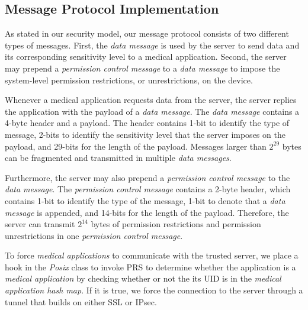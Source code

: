 \subsection{Message Protocol Implementation} 

As stated in our
security model, our message protocol consists of two different
types of messages.  First, the \textit{data message} is
used by the server to send data and its corresponding
sensitivity level to a medical application.  Second, the
server may prepend a \textit{permission control message} to a
\textit{data message} to impose the system-level permission
restrictions, or unrestrictions, on the device.

Whenever a medical application requests data from the server,
the server replies the application with the payload of a \textit{data
message}.  The \textit{data message} 
contains a 4-byte header and a payload.  The header contains 1-bit to
identify the type of message, 2-bits to identify the sensitivity level
that the server imposes on the payload, and  29-bits for the length of
the payload. Messages larger than $2^{29}$ bytes can be fragmented and
transmitted in multiple \textit{data messages}.

Furthermore, the server may also prepend a \textit{permission
 control message} to the \textit{data message}.  The
\textit{permission control message} contains a 2-byte header, which
 contains 1-bit to identify the type of the message, 1-bit to denote
that a \textit{data message} is appended, and 14-bits for
the length of the payload.  Therefore, the server can
transmit $2^{14}$ bytes of permission restrictions and
permission unrestrictions in one \textit{permission control
 message}.

To force \textit{medical applications} to communicate with
the trusted server, we place a hook in the \textit{Posix} class
to invoke PRS to determine whether the application is
a \textit{medical application} by checking whether or not the
its UID is in the 
\textit{medical application hash map}.  If it is true, we force
the connection to the server through a tunnel that builds on either
SSL or IPsec. 


